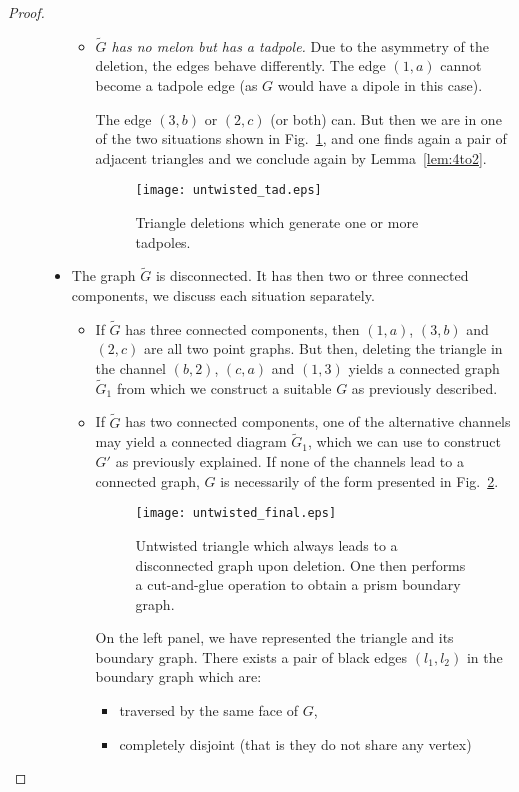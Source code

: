 \documentclass[10pt]{article}
\theoremstyle{plain}
\theoremstyle{definition}
\begin{document}
\begin{proof}
\begin{description}
\begin{itemize}
\begin{itemize}
   \item {\it $\tilde{G}$ has no melon but has a tadpole.} Due to the asymmetry of the deletion, the edges behave differently. The edge $(1,a)$ cannot become a tadpole edge (as $G$ would have a dipole in this case).
     
      The edge $(3,b)$ or $(2,c)$ (or both) can. But then we are in one of the two situations shown in Fig.~\ref{fig:untwisted_tad}, and one finds again a pair of adjacent triangles and we conclude again by Lemma~\ref{lem:4to2}.
 \begin{figure}[htb]
 \begin{center}
 \texttt{[image: untwisted\_tad.eps]}  
 \caption{Triangle deletions which generate one or more tadpoles.} \label{fig:untwisted_tad}
 \end{center}
 \end{figure}  
   \end{itemize}

\item The graph $\tilde{G}$ is disconnected. It has then two or three connected components, we discuss each situation separately. 
   \begin{itemize}
    \item If $\tilde{G}$ has three connected components, then $(1,a)$, $(3,b)$ and $(2,c)$ are all two point graphs. But then, deleting the triangle in the channel $(b,2)$, $(c,a)$ and $(1,3)$ yields a 
    connected graph $\tilde{G}_1$ from which we construct a suitable $G$ as previously described.
     \item If $\tilde{G}$ has two connected components, one of the alternative channels may yield a connected diagram $\tilde{G}_1$, which we can use to construct $G'$ as previously explained. 
     If none of the channels lead to a connected graph, $G$ is necessarily of the form presented in Fig.~\ref{fig:untwisted_final}.
\begin{figure}[htb]
 \begin{center}
 \texttt{[image: untwisted\_final.eps]}  
 \caption{Untwisted triangle which always leads to a disconnected graph upon deletion. One then performs a cut-and-glue operation to obtain a prism boundary graph.} \label{fig:untwisted_final}
 \end{center}
 \end{figure}  
On the left panel, we have represented the triangle and its boundary graph. 
There exists a pair of black edges $(l_1 , l_2)$ in the boundary graph which are:
\begin{itemize}
 \item traversed by the same face of $G$,
 \item completely disjoint (that is they do not share any vertex)
\end{itemize}


\end{itemize}
\end{itemize}
\end{description}
\end{proof}
\end{document}
